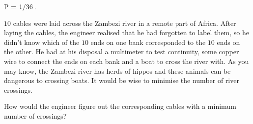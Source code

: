 \documentclass[12pt,answers]{exam}
\begin{document}
\begin{questions}
\begin{parts}
\begin{solution}
        P \(=\flatfrac{1}{36}\).
    \end{solution}
\end{parts}
\question $10$ cables were laid across the Zambezi river in a remote part of Africa. After laying the cables, the engineer realised that he had forgotten to label them, so he didn't know which of the $10$ ends on one bank corresponded to the $10$ ends on the other. He had at his disposal a multimeter to test continuity, some copper wire to connect the ends on each bank and a boat to cross the river with.  As you may know, the Zambezi river has herds of hippos and these  animals can be dangerous to crossing boats. It would be wise to minimise the number of river crossings.

How would the engineer figure out the corresponding cables with a minimum number of crossings?
\end{questions}
\end{document}
